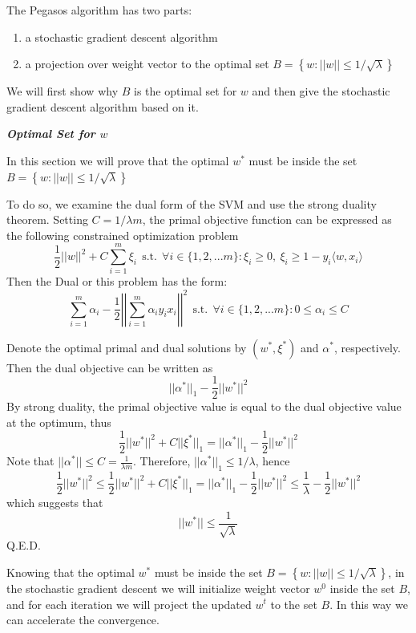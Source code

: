 \documentclass[12pt,oneside,a4paper]{article}
\begin{document}
The Pegasos algorithm has two parts:
\begin{enumerate}
\item a stochastic gradient descent algorithm
\item a projection over weight vector to the optimal set $B = \left\{ w: ||w|| \leq 1 / \sqrt{\lambda} \right\}$
\end{enumerate}
We will first show why $B$ is the optimal set for $w$ and then give the stochastic gradient descent algorithm based on it.

\textbf{\em Optimal Set for $w$}

In this section we will prove that the optimal $w^*$ must be inside the set $B = \left\{ w: ||w|| \leq 1 / \sqrt{\lambda} \right\}$

\proof
To do so, we examine the dual form of the SVM and use the strong duality theorem. Setting $C = 1 / \lambda m$, the primal objective function can be expressed as the following constrained optimization problem
$$\frac{1}{2}||w||^2 + C\sum_{i = 1}^{m}\xi_{i} ~~ \mathrm{s.t.} ~~ \forall i \in \{1, 2, ... m\}: \xi_{i} \geq 0, ~ \xi_{i} \geq 1 - y_{i} \langle w, x_{i} \rangle $$
Then the Dual or this problem has the form:
$$ \sum_{i = 1}^{m}{\alpha_{i}} - \frac{1}{2}\left|\left|\sum_{i = 1}^{m}{\alpha_{i}y_{i}x_{i}}\right|\right|^2 ~~ \mathrm{s.t.} ~~\forall i \in \{1, 2, ... m\}: 0 \leq \alpha_{i} \leq C$$

Denote the optimal primal and dual solutions by $(w^{*}, \xi^{*})$ and $\alpha^{*}$, respectively. Then the dual objective can be written as
$$||\alpha^{*}||_{1} - \frac{1}{2}||w^{*}||^2$$
By strong duality, the primal objective value is equal to the dual objective value at the optimum, thus
$$\frac{1}{2}||w^{*}||^2 + C||\xi^{*}||_{1} = ||\alpha^{*}||_{1} - \frac{1}{2}||w^{*}||^2$$
Note that $||\alpha^{*}|| \leq C = \frac{1}{\lambda m}$. Therefore, $||\alpha^{*}||_{1} \leq 1 / \lambda$, hence
$$\frac{1}{2}||w^{*}||^2 \leq \frac{1}{2}||w^{*}||^2 + C||\xi^{*}||_{1} = ||\alpha^{*}||_{1} - \frac{1}{2}||w^{*}||^2 \leq \frac{1}{\lambda} - \frac{1}{2}||w^{*}||^2$$
which suggests that
$$||w^*|| \leq \frac{1}{\sqrt\lambda}$$ Q.E.D.

Knowing that the optimal $w^*$ must be inside the set $B = \left\{ w: ||w|| \leq 1 / \sqrt{\lambda} \right\}$, in the stochastic gradient descent we will initialize weight vector $w^{0}$ inside the set $B$, and for each iteration we will project the updated $w^{t}$ to the set $B$. In this way we can accelerate the convergence.
\newline
\end{document}
